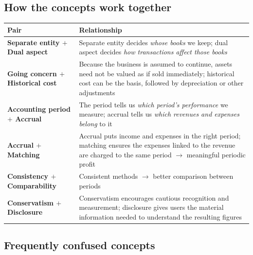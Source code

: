 \documentclass[11pt,a4paper]{article}
\begin{document}
\subsection{How the concepts work together}

\begin{center}
\small
\begin{tabularx}{\textwidth}{@{}l Y@{}}
\toprule
{}\textbf{Pair} & \textbf{Relationship}\\
\midrule
\textbf{Separate entity $+$ Dual aspect} & Separate entity decides \emph{whose books} we keep; dual aspect decides \emph{how transactions affect those books}\\
\textbf{Going concern $+$ Historical cost} & Because the business is assumed to continue, assets need not be valued as if sold immediately; historical cost can be the basis, followed by depreciation or other adjustments\\
\textbf{Accounting period $+$ Accrual} & The period tells us \emph{which period's performance} we measure; accrual tells us \emph{which revenues and expenses belong} to it\\
\textbf{Accrual $+$ Matching} & Accrual puts income and expenses in the right period; matching ensures the expenses linked to the revenue are charged to the same period $\rightarrow$ meaningful periodic profit\\
\textbf{Consistency $+$ Comparability} & Consistent methods $\rightarrow$ better comparison between periods\\
\textbf{Conservatism $+$ Disclosure} & Conservatism encourages cautious recognition and measurement; disclosure gives users the material information needed to understand the resulting figures\\
\bottomrule
\end{tabularx}
\end{center}

\subsection{Frequently confused concepts}
\end{document}
